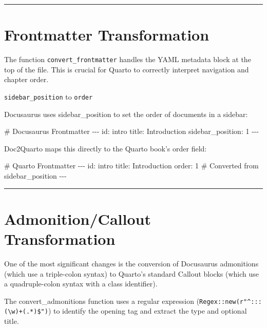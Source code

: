 \documentclass[
  letterpaper,
  DIV=11,
  numbers=noendperiod]{scrreprt}
\newenvironment{Shaded}{\begin{snugshade}}{\end{snugshade}}
\newcommand{\FunctionTok}[1]{\textcolor[rgb]{0.28,0.35,0.67}{#1}}
\newcommand{\NormalTok}[1]{\textcolor[rgb]{0.00,0.23,0.31}{#1}}
\begin{document}
\begin{center}\rule{0.5\linewidth}{0.5pt}\end{center}

\chapter{Frontmatter Transformation}\label{frontmatter-transformation}

The function \texttt{convert\_frontmatter} handles the YAML metadata
block at the top of the file. This is crucial for Quarto to correctly
interpret navigation and chapter order.

\texttt{sidebar\_position} to \texttt{order}

Docusaurus uses sidebar\_position to set the order of documents in a
sidebar:

\begin{Shaded}
\begin{Highlighting}[]
\FunctionTok{\# Docusaurus Frontmatter}
\NormalTok{{-}{-}{-}}
\NormalTok{id: intro}
\NormalTok{title: Introduction}
\NormalTok{sidebar\_position: 1}
\NormalTok{{-}{-}{-}}
\end{Highlighting}
\end{Shaded}

Doc2Quarto maps this directly to the Quarto book's order field:

\begin{Shaded}
\begin{Highlighting}[]
\FunctionTok{\# Quarto Frontmatter}
\NormalTok{{-}{-}{-}}
\NormalTok{id: intro}
\NormalTok{title: Introduction}
\NormalTok{order: 1 \# Converted from sidebar\_position}
\NormalTok{{-}{-}{-}}
\end{Highlighting}
\end{Shaded}

\begin{center}\rule{0.5\linewidth}{0.5pt}\end{center}

\chapter{Admonition/Callout
Transformation}\label{admonitioncallout-transformation}

One of the most significant changes is the conversion of Docusaurus
admonitions (which use a triple-colon syntax) to Quarto's standard
Callout blocks (which use a quadruple-colon syntax with a class
identifier).

The convert\_admonitions function uses a regular expression
(\texttt{Regex::new(r"\^{}:::(\textbackslash{}w)+(.*)\$")}) to identify
the opening tag and extract the type and optional title.
\end{document}
